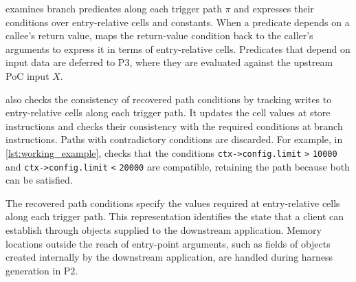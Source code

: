 
\sys examines branch predicates along each trigger path $\pi$ and expresses their conditions over entry-relative cells and constants.
When a predicate depends on a callee's return value, \sys maps the return-value condition back to the caller's arguments to express it in terms of entry-relative cells. Predicates that depend on input data are deferred to P3, where they are evaluated against the upstream PoC input $X$.

\sys also checks the consistency of recovered path conditions by tracking writes to entry-relative cells along each trigger path. 
It updates the cell values at store instructions and checks their consistency with the required conditions at branch instructions. Paths with contradictory conditions are discarded. For example, in 
\autoref{lst:working_example}, \sys checks that the conditions \texttt{ctx->config.limit} \texttt{>} \texttt{10000} and \texttt{ctx->config.limit} \texttt{<} \texttt{20000} are compatible, retaining the path because both can be satisfied.

The recovered path conditions specify the values required at entry-relative cells along each trigger path. This representation identifies the state that a client can establish through objects supplied to the downstream application. Memory locations outside the reach of entry-point arguments, such as fields of objects created internally by the downstream application, are handled during harness generation in P2.

